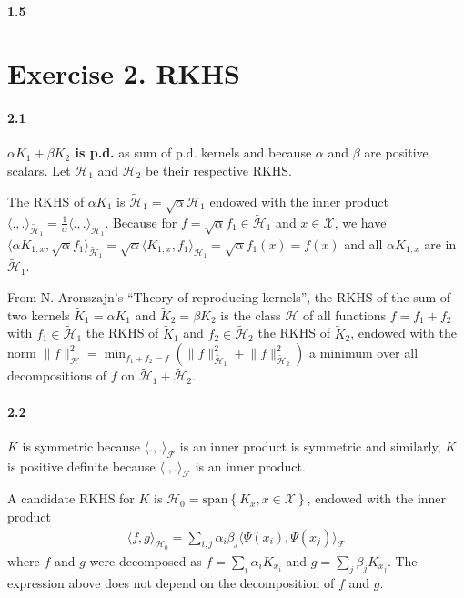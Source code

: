\documentclass[10pt]{article}
\begin{document}
    \paragraph{1.5}

    \section*{Exercise 2. RKHS}
    \paragraph{2.1} \textbf{$\alpha K_1 + \beta K_2$ is p.d.} as sum of p.d. 
    kernels and because $\alpha$ and $\beta$ are positive scalars. Let 
    $\mathcal{H}_1$ and $\mathcal{H}_2$ be their respective RKHS.

    The RKHS of $\alpha K_1$ is $\tilde{\mathcal{H}}_1 = \sqrt{\alpha}
    \mathcal{H}_1$ endowed with the inner product $\langle.,.
    \rangle_{\tilde{\mathcal{H}}_1} = \frac{1}{\alpha}\langle.,.
    \rangle_{\mathcal{H}_1}$. 
    Because for $f = \sqrt{\alpha}f_1 \in\tilde{\mathcal{H}}_1$ and $x\in 
    \mathcal{X}$,  we have
    $\langle \alpha K_{1,x} , \sqrt{\alpha} f_1 
    \rangle_{\tilde{\mathcal{H}}_1} =  \sqrt{\alpha} \langle K_{1,x} , 
    f_1 \rangle_{\mathcal{H}_1} = \sqrt{\alpha} f_1(x) = f(x)$ and all $\alpha 
    K_{1,x}$ are in $\tilde{\mathcal{H}}_1$.

    From N. Aronszajn's ``Theory of reproducing kernels'', the RKHS of the sum 
    of two kernels $\tilde{K}_1 = \alpha K_1$ and $\tilde{K}_2 = \beta K_2$ is 
    the class $\mathcal{H}$ of all functions $f = f_1 + f_2$ with $f_1 \in 
    \tilde{\mathcal{H}}_1$ the RKHS of $\tilde{K}_1$ and $f_2 \in 
    \tilde{\mathcal{H}}_2$ the RKHS of $\tilde{K}_2$, endowed with the norm 
    $\lVert f \rVert^2_{\mathcal{H}} = \min_{f_1 + f_2 = f} \left(\lVert f 
    \rVert^2_{\tilde{\mathcal{H}}_1} + \lVert f 
    \rVert^2_{\tilde{\mathcal{H}}_2}\right)$ a minimum over all decompositions 
    of $f$ on $\tilde{\mathcal{H}}_1 + \tilde{\mathcal{H}}_2$.

    \paragraph{2.2} $K$ is symmetric because $\langle., .
    \rangle_\mathcal{F}$ is an inner product is symmetric 
    and similarly, $K$ is positive definite because $\langle., .
    \rangle_\mathcal{F}$ is an inner product.

    A candidate RKHS for $K$ is $\mathcal{H}_0 = \text{span}\left\{ K_x, x\in 
    \mathcal{X}\right\}$, endowed with the inner product 
    \begin{align*}
        \langle f, g \rangle_{\mathcal{H}_0} = \sum_{i,j} \alpha_i \beta_j 
        \langle \Psi(x_i), \Psi(x_j) \rangle_\mathcal{F}
    \end{align*}
    where $f$ and $g$ were decomposed as $f = \sum_i \alpha_i K_{x_i}$ and $g = 
    \sum_j \beta_j K_{x_j}$. The expression above does not depend on the 
    decomposition of $f$ and $g$.
\end{document}

